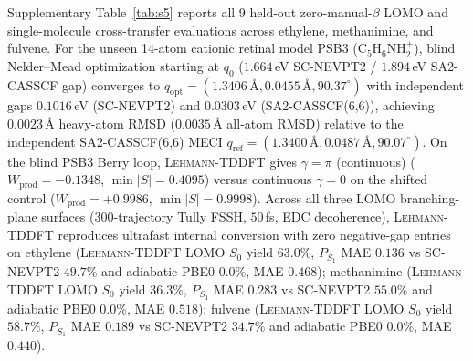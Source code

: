 \documentclass[10pt,a4paper]{article}
\newcommand{\leh}{{\rmfamily\scshape Lehmann}-TDDFT}
\begin{document}
Supplementary Table~\ref{tab:s5} reports all 9 held-out zero-manual-$\beta$ LOMO and single-molecule cross-transfer evaluations across ethylene, methanimine, and fulvene. For the unseen 14-atom cationic retinal model PSB3 ($\mathrm{C}_5\mathrm{H}_6\mathrm{NH}_2^+$), blind Nelder--Mead optimization starting at $q_0$ ($1.664$\,eV SC-NEVPT2 / $1.894$\,eV SA2-CASSCF gap) converges to $q_{\mathrm{opt}} = (1.3406\,\text{\AA}, 0.0455\,\text{\AA}, 90.37^\circ)$ with independent gaps $0.1016$\,eV (SC-NEVPT2) and $0.0303$\,eV (SA2-CASSCF(6,6)), achieving $0.0023$\,\AA{} heavy-atom RMSD ($0.0035$\,\AA{} all-atom RMSD) relative to the independent SA2-CASSCF(6,6) MECI $q_{\mathrm{ref}} = (1.3400\,\text{\AA}, 0.0487\,\text{\AA}, 90.07^\circ)$. On the blind PSB3 Berry loop, \leh{} gives $\gamma=\pi$ (continuous) ($W_{\mathrm{prod}}=-0.1348$, $\min|S|=0.4095$) versus continuous $\gamma=0$ on the shifted control ($W_{\mathrm{prod}}=+0.9986$, $\min|S|=0.9998$). Across all three LOMO branching-plane surfaces (300-trajectory Tully FSSH, $50$\,fs, EDC decoherence), \leh{} reproduces ultrafast internal conversion with zero negative-gap entries on ethylene (\leh{} LOMO $S_0$ yield $63.0\%$, $P_{S_1}$ MAE $0.136$ vs SC-NEVPT2 $49.7\%$ and adiabatic PBE0 $0.0\%$, MAE $0.468$); methanimine (\leh{} LOMO $S_0$ yield $36.3\%$, $P_{S_1}$ MAE $0.283$ vs SC-NEVPT2 $55.0\%$ and adiabatic PBE0 $0.0\%$, MAE $0.518$); fulvene (\leh{} LOMO $S_0$ yield $58.7\%$, $P_{S_1}$ MAE $0.189$ vs SC-NEVPT2 $34.7\%$ and adiabatic PBE0 $0.0\%$, MAE $0.440$).
\end{document}
